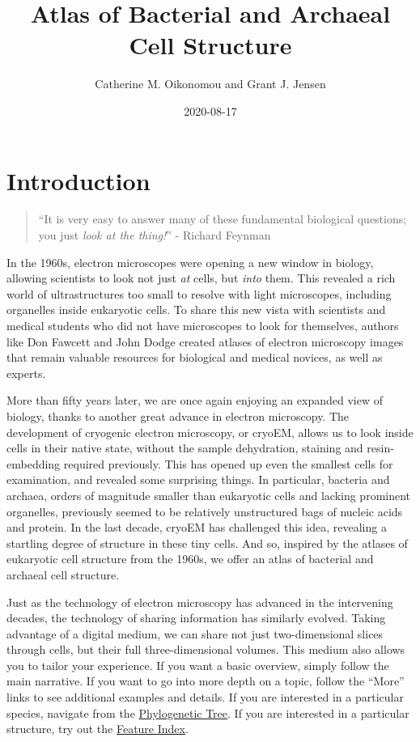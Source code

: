 \documentclass[]{tufte-book}
\title{Atlas of Bacterial and Archaeal Cell Structure}
\author{Catherine M. Oikonomou and Grant J. Jensen}
\date{2020-08-17}
\begin{document}
\maketitle



{
\setcounter{tocdepth}{1}
\tableofcontents
}

\hypertarget{introduction}{%
\chapter*{Introduction}\label{introduction}}

\begin{quote}
``It is very easy to answer many of these fundamental biological questions; you just \emph{look at the thing!}''
- Richard Feynman \citep{feynman1960}
\end{quote}

In the 1960s, electron microscopes were opening a new window in biology, allowing scientists to look not just \emph{at} cells, but \emph{into} them. This revealed a rich world of ultrastructures too small to resolve with light microscopes, including organelles inside eukaryotic cells. To share this new vista with scientists and medical students who did not have microscopes to look for themselves, authors like Don Fawcett \citep{fawcett1966} and John Dodge \citep{dodge1968} created atlases of electron microscopy images that remain valuable resources for biological and medical novices, as well as experts.

More than fifty years later, we are once again enjoying an expanded view of biology, thanks to another great advance in electron microscopy. The development of cryogenic electron microscopy, or cryoEM, allows us to look inside cells in their native state, without the sample dehydration, staining and resin-embedding required previously. This has opened up even the smallest cells for examination, and revealed some surprising things. In particular, bacteria and archaea, orders of magnitude smaller than eukaryotic cells and lacking prominent organelles, previously seemed to be relatively unstructured bags of nucleic acids and protein. In the last decade, cryoEM has challenged this idea, revealing a startling degree of structure in these tiny cells. And so, inspired by the atlases of eukaryotic cell structure from the 1960s, we offer an atlas of bacterial and archaeal cell structure.

Just as the technology of electron microscopy has advanced in the intervening decades, the technology of sharing information has similarly evolved. Taking advantage of a digital medium, we can share not just two-dimensional slices through cells, but their full three-dimensional volumes. This medium also allows you to tailor your experience. If you want a basic overview, simply follow the main narrative. If you want to go into more depth on a topic, follow the ``More'' links to see additional examples and details. If you are interested in a particular species, navigate from the \protect\hyperlink{tree}{Phylogenetic Tree}. If you are interested in a particular structure, try out the \protect\hyperlink{feature-index}{Feature Index}.
\end{document}
